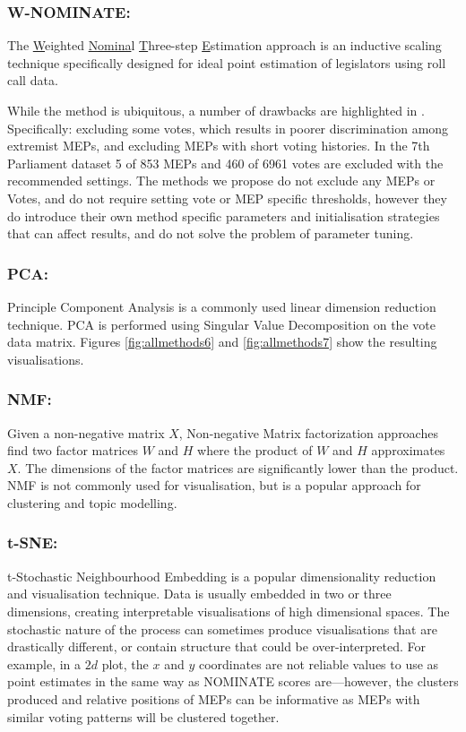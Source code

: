 \documentclass{llncs}
\begin{document}
\subsubsection {W-NOMINATE:} The \underline{W}eighted \underline{Nomina}l \underline{T}hree-step \underline{E}stimation approach\cite{wnominate} is an inductive scaling technique specifically designed for ideal point estimation of legislators using roll call data.

While the method is ubiquitous, a number of drawbacks are highlighted in \cite{clinton2003statistical}. Specifically: excluding some votes, which results in poorer discrimination among extremist MEPs, and excluding MEPs with short voting histories. In the 7th Parliament dataset 5 of 853 MEPs and 460 of 6961 votes are excluded with the recommended settings. The methods we propose do not exclude any MEPs or Votes, and do not require setting vote or MEP specific thresholds, however they do introduce their own method specific parameters and initialisation strategies that can affect results, and do not solve the problem of parameter tuning.

\subsubsection{PCA:}
Principle Component Analysis\cite{Fodor02DRSurvey} is a commonly used linear dimension reduction technique. PCA is performed using Singular Value Decomposition on the vote data matrix. Figures \ref{fig:allmethods6} and \ref{fig:allmethods7} show the resulting visualisations.

\subsubsection{NMF:}
Given a non-negative matrix $X$, Non-negative Matrix factorization\cite{nmf1} approaches find two factor matrices $W$ and $H$ where the product of $W$ and $H$ approximates $X$. The dimensions of the factor matrices are significantly lower than the product. NMF is not commonly used for visualisation, but is a popular approach for clustering\cite{nmf} and topic modelling.

\subsubsection{t-SNE:}
t-Stochastic Neighbourhood Embedding is a popular dimensionality reduction and visualisation technique. Data is usually embedded in two or three dimensions, creating interpretable visualisations of high dimensional spaces. The stochastic nature of the process can sometimes produce visualisations that are drastically different, or contain structure that could be over-interpreted. For example, in a $2d$ plot, the $x$ and $y$ coordinates are not reliable values to use as point estimates in the same way as NOMINATE scores are---however, the clusters produced and relative positions of MEPs can be informative as MEPs with similar voting patterns will be clustered together. 
\end{document}
